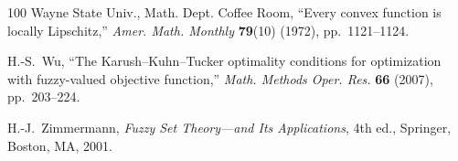 \documentclass{article}
\theoremstyle{definition}
\begin{document}
\begin{thebibliography}{100}
Wayne State Univ., Math. Dept. Coffee Room,
``Every convex function is locally Lipschitz,''
\emph{Amer. Math. Monthly} \textbf{79}(10) (1972), pp.~1121--1124.

H.-S.~Wu,
``The Karush--Kuhn--Tucker optimality conditions for optimization with fuzzy-valued objective function,''
\emph{Math. Methods Oper. Res.} \textbf{66} (2007), pp.~203--224.

H.-J.~Zimmermann,
\emph{Fuzzy Set Theory---and Its Applications},
4th ed., Springer, Boston, MA, 2001.

\end{thebibliography} 
\end{document}
